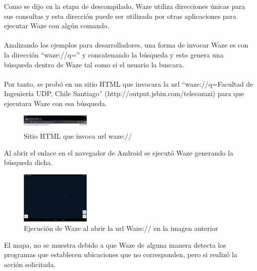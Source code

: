Como se dijo en la etapa de descompilado, Waze utiliza direcciones únicas para sus consultas y esta dirección puede ser utilizada por otras aplicaciones para ejecutar Waze con algún comando.
\\\\
Analizando los ejemplos para desarrolladores, una forma de invocar Waze es con la dirección “waze://q=” y concatenando la búsqueda y esto genera una búsqueda dentro de Waze tal como si el usuario la buscara.
\\\\
Por tanto, se probó en un sitio HTML que invocara la url “waze://q=Facultad de Ingeniería UDP, Chile Santiago” (http://output.jsbin.com/telecozazi) para que ejecutara Waze con esa búsqueda.

        \begin{figure}[H]
  \begin{center}
    \includegraphics[width=0.3\textwidth]{imagenes/fig43.png}
    \caption{Sitio HTML que invoca url waze://}
  \end{center}
\end{figure}


Al abrir el enlace en el navegador de Android se ejecutó Waze generando la búsqueda dicha.

        \begin{figure}[H]
  \begin{center}
    \includegraphics[width=0.3\textwidth]{imagenes/fig44.png}
    \caption{Ejecución de Waze al abrir la url Waze:// en la imagen anterior}
  \end{center}
\end{figure}


El mapa, no se muestra debido a que Waze de alguna manera detecta los programas que establecen ubicaciones que no corresponden, pero si realizó la acción solicitada.
